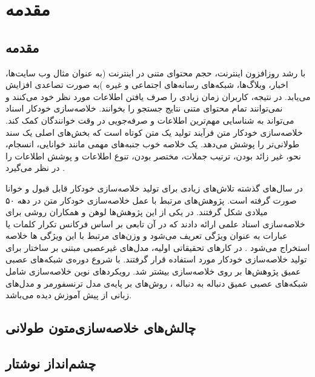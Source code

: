 \chapter{مقدمه}
\section{مقدمه}
با رشد روزافزون اینترنت، حجم محتوای متنی در اینترنت (به عنوان مثال وب سایت‌ها، اخبار، وبلاگ‌ها، شبکه‌های رسانه‌های اجتماعی و غیره )به صورت تصاعدی افزایش می‌یابد. در نتیجه، کاربران زمان زیادی را صرف یافتن اطلاعات مورد نظر خود می‌کنند و نمی‌توانند تمام محتوای متنی نتایج جستجو را بخوانند. خلاصه‌سازی خودکار اسناد می‌تواند به شناسایی مهم‌ترین اطلاعات و صرفه‌جویی در وقت خوانندگان کمک کند. خلاصه‌سازی خودکار متن فرآیند تولید یک متن کوتاه است که بخش‌های اصلی یک سند طولانی‌تر را پوشش می‌دهد. یک خلاصه خوب جنبه‌های مهمی مانند خوانایی، انسجام، نحو، غیر زائد بودن، ترتیب جملات، مختصر بودن، تنوع اطلاعات و پوشش اطلاعات را در نظر می‌گیرد
\cite{ELKASSAS2021113679}.


در سال‌های گذشته تلاش‌های زیادی برای تولید خلاصه‌سازی خودکار قابل قبول و خوانا صورت گرفته است. 
پژوهش‌های مرتبط با عمل خلاصه‌سازی خودکار متن در دهه ۵۰ میلادی شکل گرفتند. در یکی از این پژوهش‌ها لوهن و همکاران روشی برای خلاصه‌سازی اسناد علمی ‌ارائه دادند که در آن تابعی بر اساس فرکانس تکرار کلمات یا عبارات به عنوان ویژگی تعریف ‌می‌شود و وزن‌های مرتبط با این ویژگی ها خلاصه استخراج می‌شود
\cite{luhn1958automatic}.
در کارهای تحقیقاتی اولیه، مدل‌های غیرعصبی  مبتنی بر ساختار برای تولید خلاصه‌سازی خودکار مورد استفاده قرار گرفتند. با شروع دوره‌ی شبکه‌های عصبی عمیق پژوهش‌ها بر روی خلاصه‌سازی بیشتر شد. رویکرد‌های نوین خلاصه‌سازی شامل شبکه‌های عصبی عمیق دنباله به دنباله
، روش‌های بر پایه‌ی مدل ترنسفورمر 
و مدل‌های زبانی از پیش آموزش دیده
می‌باشد. 
\section{چالش‌های خلاصه‌سازی‌متون طولانی}
 
\section{چشم‌انداز نوشتار}

